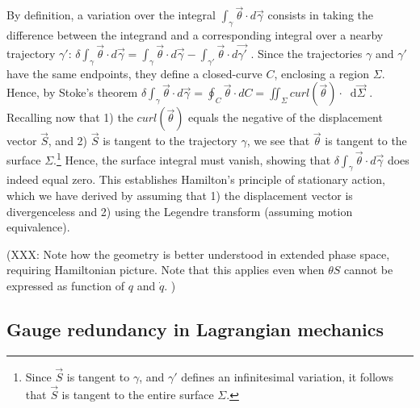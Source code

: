 \documentclass[letterpaper]{article}
\newcommand{\diff}{\mathop{}\!\mathrm{d}} %
\renewcommand{\vector}[1]{\ensuremath{\vec{#1}}} %
\newcommand{\integral}{\int}
\begin{document}
By definition, a variation over the integral $\integral_{\gamma} \vector{\theta} \cdot d\vector{\gamma}$ consists in taking the difference between the integrand and a corresponding integral over a nearby trajectory $\gamma'$: $\delta \integral_{\gamma} \vector{\theta} \cdot d\vector{\gamma} = \integral_{\gamma} \vector{\theta} \cdot d\vector{\gamma} - \integral_{\gamma'} \vector{\theta} \cdot d\vector{\gamma'}$ . Since the trajectories $\gamma$ and $\gamma'$ have the same endpoints, they define a closed-curve $C$, enclosing a region $\Sigma $. Hence, by Stoke's theorem $\delta \integral_{\gamma} \vector{\theta} \cdot d\vector{\gamma} = \oint_{C} \vector{\theta}  \cdot dC = \iint_{\Sigma} curl(\vector{\theta}) \cdot \diff \vector{\Sigma}$ . Recalling now that 1) the $curl(\vector{\theta})$ equals the negative of the displacement vector $\vector{S}$, and 2)  $\vector{S}$ is tangent to the trajectory $\gamma $, we see that $\vector{\theta}$ is tangent to the surface $\Sigma $.\footnote{Since $\vector{S}$ is tangent to $\gamma $, and $\gamma'$ defines an infinitesimal variation, it follows that $\vector{S}$ is tangent to the entire surface $\Sigma $.} Hence, the surface integral must vanish, showing that $\delta \integral_{\gamma} \vector{\theta} \cdot d\vector{\gamma}$ does indeed equal zero. This establishes Hamilton's principle of stationary action, which we have derived by assuming that 1) the displacement vector is divergenceless and 2) using the Legendre transform (assuming motion equivalence).

(XXX: Note how the geometry is better understood in extended phase space, requiring Hamiltonian picture. Note that this applies even when $\theta S$ cannot be expressed as function of $q$ and $\dot q$. )


\subsection{Gauge redundancy in Lagrangian mechanics}
\label{gauge}
\end{document}

